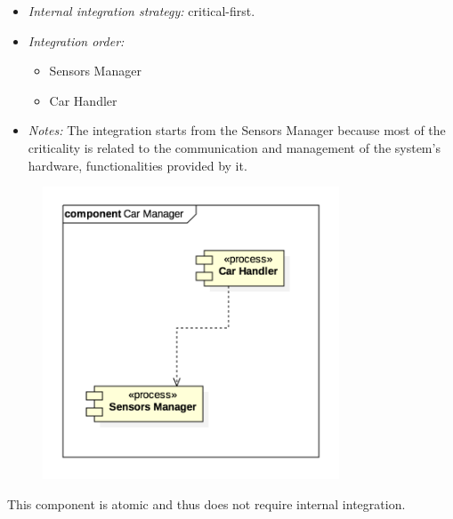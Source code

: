 			\begin{itemize}[label={},leftmargin=*,noitemsep,topsep=0pt]
				\item \textit{Internal integration strategy:} critical-first.
				\item \textit{Integration order:}
					\begin{itemize}[noitemsep]
						\item Sensors Manager
						\item Car Handler
					\end{itemize}
				\item \textit{Notes: } The integration starts from the Sensors Manager because most of the criticality is related to the communication and management of the system's hardware, functionalities provided by it.
			\end{itemize}
			\begin{figure}[h]
				\includegraphics[width=250pt, center]{img/integration_strategy/subcomponents/car_manager.png}
			\end{figure}
		\FloatBarrier

			This component is atomic and thus does not require internal integration.

